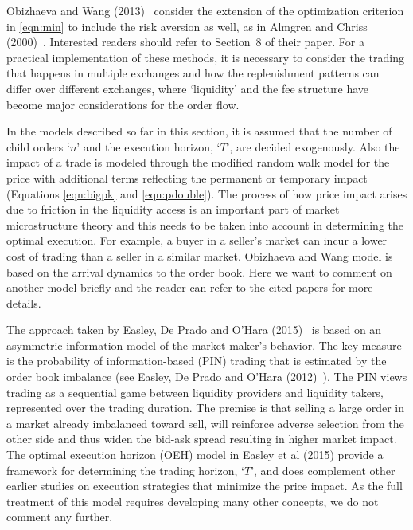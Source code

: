 Obizhaeva and Wang (2013)~\cite{obizhaeva} consider the extension of the optimization criterion in \eqref{eqn:min} to include the risk aversion as well, as in Almgren and Chriss (2000)~\cite{alm2000}. Interested readers should refer to Section~8 of their paper. For a practical implementation of these methods, it is necessary to consider the trading that happens in multiple exchanges and how the replenishment patterns can differ over different exchanges, where `liquidity' and the fee structure have become major considerations for the order flow. 


In the models described so far in this section, it is assumed that the number of child orders `$n$' and the execution horizon, `$T$', are decided exogenously. Also the impact of a trade is modeled through the modified random walk model for the price with additional terms reflecting the permanent or temporary impact (Equations \ref{eqn:bigpk} and \ref{eqn:pdouble}). The process of how price impact arises due to friction in the liquidity access is an important part of market microstructure theory and this needs to be taken into account in determining the optimal execution. For example, a buyer in a seller's market can incur a lower cost of trading than a seller in a similar market. Obizhaeva and Wang model is based on the arrival dynamics to the order book. Here we want to comment on another model briefly and the reader can refer to the cited papers for more details.


The approach taken by Easley, De Prado and O'Hara (2015)~\cite{prado2} is based on an asymmetric information model of the market maker's behavior. The key measure is the probability of information-based (PIN) trading that is estimated by the order book imbalance (see Easley, De Prado and O'Hara (2012)~\cite{prado3}). The PIN views trading as a sequential game between liquidity providers and liquidity takers, represented over the trading duration. The premise is that selling a large order in a market already imbalanced toward sell, will reinforce adverse selection from the other side and thus widen the bid-ask spread resulting in higher market impact. The optimal execution horizon (OEH) model in Easley et al (2015) provide a framework for determining the trading horizon, `$T$', and does complement other earlier studies on execution strategies that minimize the price impact. As the full treatment of this model requires developing many other concepts, we do not comment any further. 


